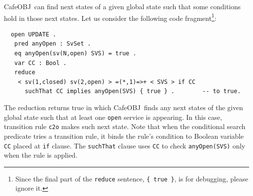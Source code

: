 \documentclass[12pt]{report}
\newcommand{\stt}[1]{{\small{\tt {#1}}}}
\newcommand{\cafeobj}{{\sf CafeOBJ}~}
\begin{document}
\cafeobj can find next states of a given global state such that some
conditions hold in those next states. Let us consider the following
code fragment\footnote{Since the final part of the {\tt reduce} sentence,
  {\tt \{~true~\}}, is for debugging, please ignore it.}:
\small
\begin{verbatim}
  open UPDATE .
   pred anyOpen : SvSet .
   eq anyOpen(sv(N,open) SVS) = true .
   var CC : Bool .
   reduce 
    < sv(1,closed) sv(2,open) > =(*,1)=>+ < SVS > if CC
      suchThat CC implies anyOpen(SVS) { true } .        -- to true.
\end{verbatim}
\normalsize
The reduction returns true in which \cafeobj finds any next states of
the given global state such that at least one {\tt open} service is
appearing. In this case, transition rule {\tt c2o} makes such next
state.  Note that when the conditional search predicate tries a
transition rule, it binds the rule's condition to Boolean variable
{\tt CC} placed at {\tt i\!f} clause. The {\tt suchThat} clause uses
{\tt CC} to check \stt{anyOpen(SVS)} only when the rule is applied.
\end{document}
